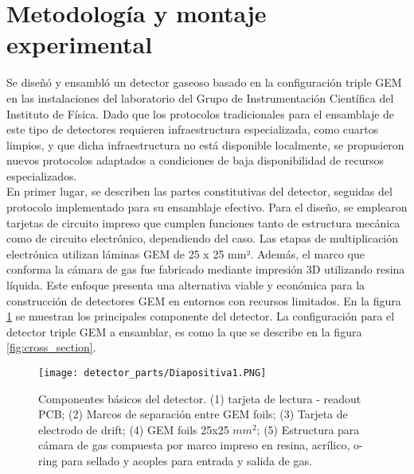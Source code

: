 \documentclass{report}
\begin{document}
\section{Metodología y montaje experimental}

\noindent Se diseñó y ensambló un detector gaseoso basado en la configuración triple GEM en las instalaciones del laboratorio del Grupo de Instrumentación Científica del Instituto de Física. Dado que los protocolos tradicionales para el ensamblaje de este tipo de detectores requieren infraestructura especializada, como cuartos limpios, y que dicha infraestructura no está disponible localmente, se propusieron nuevos protocolos adaptados a condiciones de baja disponibilidad de recursos especializados.\\

\noindent En primer lugar, se describen las partes constitutivas del detector, seguidas del protocolo implementado para su ensamblaje efectivo. Para el diseño, se emplearon tarjetas de circuito impreso que cumplen funciones tanto de estructura mecánica como de circuito electrónico, dependiendo del caso. Las etapas de multiplicación electrónica utilizan láminas GEM de 25 x 25 mm². Además, el marco que conforma la cámara de gas fue fabricado mediante impresión 3D utilizando resina líquida. Este enfoque presenta una alternativa viable y económica para la construcción de detectores GEM en entornos con recursos limitados. En la figura \ref{fig:partes_gem} se muestran los principales componente del detector. La configuración para el detector triple GEM a ensamblar, es como la que se describe en la figura \ref{fig:cross_section}. 

\begin{figure}[H]
    \centering
    \texttt{[image: detector\_parts/Diapositiva1.PNG]}
    \caption{Componentes básicos del detector. (1) tarjeta de lectura - readout PCB; (2) Marcos de separación entre GEM foils; (3) Tarjeta de electrodo de drift; (4) GEM foils 25x25 $mm^{2}$; (5) Estructura para cámara de gas compuesta por marco impreso en resina, acrílico, o-ring para sellado y acoples para entrada y salida de gas.}
    \label{fig:partes_gem}
\end{figure}
\end{document}
